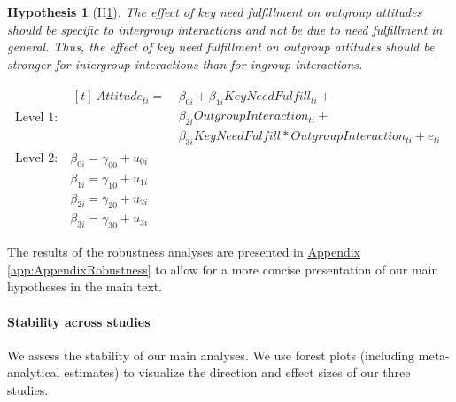 \documentclass[man, 12pt, a4paper, mask]{apa7}
\theoremstyle{break}
\theoremstyle{plain}
\newtheorem{hyp}{Hypothesis}
\newcommand{\appref}[2][]{\hyperref[#2]{Appendix \ref*{#2}#1}}
\begin{document}
\begin{mdframed}[style=mdfhypothesis]
    \begin{hyp}[H\ref{hyp:keyNeedContactType}] \label{hyp:keyNeedContactType}
    \addtolength{\leftskip}{1em}
    The effect of key need fulfillment on outgroup attitudes should be specific to intergroup interactions and not be due to need fulfillment in general. Thus, the effect of key need fulfillment on outgroup attitudes should be stronger for intergroup interactions than for ingroup interactions. 
    \end{hyp}

    \begin{fleqn}[\eqskip-\subhypskip]
      \begin{equation} \label{eq:SlopesAttCoreXContact}
        \begin{split}
          \textrm{Level 1:} &
            \begin{aligned}[t]
              \ Attitude_{ti} =  &\ \beta_{0i} + \beta_{1i}KeyNeedFulfill_{ti} + \\
                                 &\ \beta_{2i}OutgroupInteraction_{ti} + \\
                                 &\ \beta_{3i}KeyNeedFulfill*OutgroupInteraction_{ti} + e_{ti}
            \end{aligned} \\
          \textrm{Level 2:} &\ \beta_{0i} = \gamma_{00} + u_{0i} \\
                            &\ \beta_{1i} = \gamma_{10} + u_{1i} \\
                            &\ \beta_{2i} = \gamma_{20} + u_{2i} \\
                            &\ \beta_{3i} = \gamma_{30} + u_{3i}
        \end{split} 
      \end{equation}
    \end{fleqn}
\end{mdframed}
The results of the robustness analyses are presented in \appref{app:AppendixRobustness} to allow for a more concise presentation of our main hypotheses in the main text.

\paragraph{Stability across studies}
We assess the stability of our main analyses. We use forest plots (including meta-analytical estimates) to visualize the direction and effect sizes of our three studies.
\end{document}
